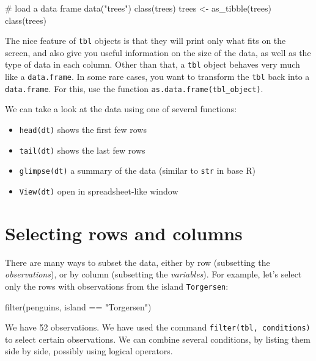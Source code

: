\documentclass[
  letterpaper,
  DIV=11,
  numbers=noendperiod]{scrreprt}
\newenvironment{Shaded}{\begin{snugshade}}{\end{snugshade}}
\newcommand{\NormalTok}[1]{\textcolor[rgb]{0.00,0.23,0.31}{#1}}
\providecommand{\tightlist}{%
  \setlength{\itemsep}{0pt}\setlength{\parskip}{0pt}}\usepackage{longtable,booktabs,array}
\begin{document}
\begin{Shaded}
\begin{Highlighting}[]
\NormalTok{\# load a data frame}
\NormalTok{data("trees")}
\NormalTok{class(trees)}
\NormalTok{trees \textless{}{-} as\_tibble(trees)}
\NormalTok{class(trees)}
\end{Highlighting}
\end{Shaded}

The nice feature of \texttt{tbl} objects is that they will print only
what fits on the screen, and also give you useful information on the
size of the data, as well as the type of data in each column. Other than
that, a \texttt{tbl} object behaves very much like a
\texttt{data.frame}. In some rare cases, you want to transform the
\texttt{tbl} back into a \texttt{data.frame}. For this, use the function
\texttt{as.data.frame(tbl\_object)}.

We can take a look at the data using one of several functions:

\begin{itemize}
\tightlist
\item
  \texttt{head(dt)} shows the first few rows
\item
  \texttt{tail(dt)} shows the last few rows
\item
  \texttt{glimpse(dt)} a summary of the data (similar to \texttt{str} in
  base R)
\item
  \texttt{View(dt)} open in spreadsheet-like window
\end{itemize}

\section{Selecting rows and columns}\label{selecting-rows-and-columns}

There are many ways to subset the data, either by row (subsetting the
\emph{observations}), or by column (subsetting the \emph{variables}).
For example, let's select only the rows with observations from the
island \texttt{Torgersen}:

\begin{Shaded}
\begin{Highlighting}[]
\NormalTok{filter(penguins, island == "Torgersen")}
\end{Highlighting}
\end{Shaded}

We have 52 observations. We have used the command
\texttt{filter(tbl,\ conditions)} to select certain observations. We can
combine several conditions, by listing them side by side, possibly using
logical operators.
\end{document}
